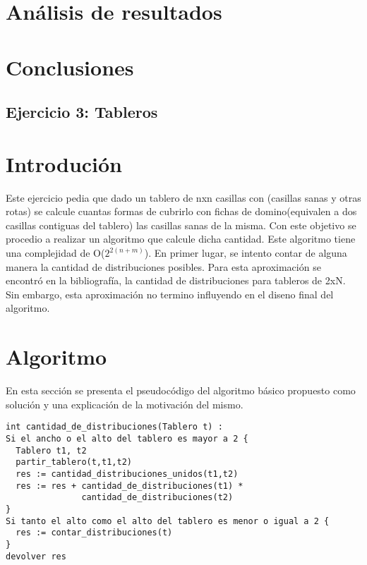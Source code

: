 \documentclass[a4paper, 12pt] {article}
\begin{document}
\section*{An\'alisis de resultados}

\section*{Conclusiones}
\newpage

\begin{center}
 \section*{Ejercicio 3: Tableros}
\end{center}

\bigskip
\section*{Introduci\'on}
Este ejercicio pedia que dado un tablero de nxn casillas con (casillas sanas y otras rotas) se calcule cuantas formas de cubrirlo con fichas de domino(equivalen a dos casillas contiguas del tablero) las casillas sanas de la misma.
Con este objetivo se procedio a realizar un algoritmo que calcule dicha cantidad. Este algoritmo tiene una complejidad de O($2^{2\left(n+m \right) }$). En primer lugar, se intento contar de alguna manera la cantidad de distribuciones posibles. Para esta aproximaci\'on se encontr\'o en la bibliograf\'ia, la cantidad de distribuciones para tableros de 2xN. Sin embargo, esta aproximaci\'on no termino influyendo en el diseno final del algoritmo.
\section*{Algoritmo}
En esta secci\'on se presenta el pseudoc\'odigo del algoritmo b\'asico propuesto como soluci\'on y una explicaci\'on de la motivaci\'on del mismo.
\begin{verbatim}
int cantidad_de_distribuciones(Tablero t) :
Si el ancho o el alto del tablero es mayor a 2 {
  Tablero t1, t2
  partir_tablero(t,t1,t2)
  res := cantidad_distribuciones_unidos(t1,t2) 
  res := res + cantidad_de_distribuciones(t1) * 
               cantidad_de_distribuciones(t2)
}
Si tanto el alto como el alto del tablero es menor o igual a 2 {
  res := contar_distribuciones(t)
}
devolver res
\end{verbatim}
\end{document}
